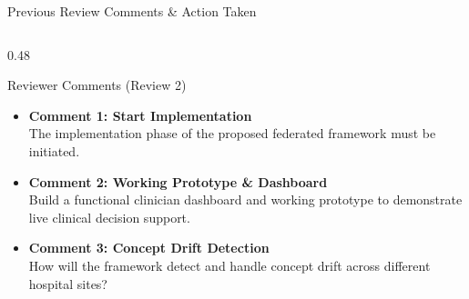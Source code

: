 \documentclass[aspectratio=169, 11pt]{beamer}
\begin{document}
\begin{frame}{Previous Review Comments \& Action Taken}
    \begin{columns}[t]
        \begin{column}{0.48\textwidth}
            \begin{block}{Reviewer Comments (Review 2)}
                \scriptsize
                \begin{itemize}
                    \item \textbf{Comment 1: Start Implementation} \\
                    The implementation phase of the proposed federated framework must be initiated.
                    
                    \vspace{0.3cm}
                    \item \textbf{Comment 2: Working Prototype \& Dashboard} \\
                    Build a functional clinician dashboard and working prototype to demonstrate live clinical decision support.
                    
                    \vspace{0.3cm}
                    \item \textbf{Comment 3: Concept Drift Detection} \\
                    How will the framework detect and handle concept drift across different hospital sites?
                \end{itemize}
            \end{block}
        \end{column}
        

\end{columns}
\end{frame}
\end{document}

